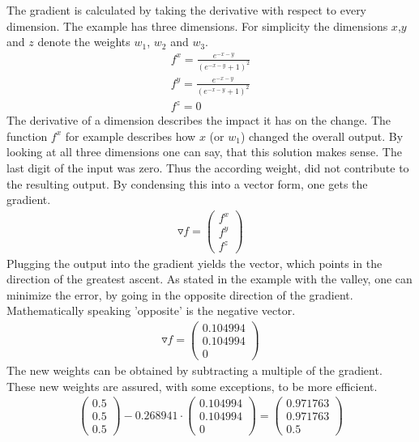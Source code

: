 \documentclass[12pt]{article}
\begin{document}
The gradient is calculated by taking the derivative with respect to every dimension.  The example has three dimensions. For simplicity the dimensions $x$,$y$ and $z$ denote the weights $ w_{1} $, $ w_{2} $ and $ w_{3}$. 
\begin{equation}\nonumber
\begin{gathered}
f^{x} = \frac{e^{-x-y}}{\left ( e^{-x-y}+1 \right )^{2}}\\
f^{y} = \frac{e^{-x-y}}{\left ( e^{-x-y}+1 \right )^{2}}\\
f^{z} = 0
\end{gathered}
\end{equation}
The derivative of a dimension describes the impact it has on the change. The function $f^{x}$ for example describes how $x$ (or $w_{1}$) changed the overall output. By looking at all three dimensions one can say, that this solution makes sense. The last digit of the input was zero. Thus the according weight, did not contribute to the resulting output. By condensing this into a vector form, one gets the gradient.
\begin{equation}\nonumber
\begin{gathered}
\triangledown f = \begin{pmatrix}f^{x}\\ f^{y}\\ f^{z}
\end{pmatrix}
\end{gathered}
\end{equation}
Plugging the output into the gradient yields the vector, which points in the direction of the greatest ascent. As stated in the example with the valley, one can minimize the error, by going in the opposite direction of the gradient. Mathematically speaking 'opposite' is the negative vector. 
\begin{equation}
\begin{gathered}
\triangledown f = \begin{pmatrix}0.104994\\ 0.104994\\ 0
\end{pmatrix}
\end{gathered}
\end{equation}
The new weights can be obtained by subtracting a multiple of the gradient. These new weights are assured, with some exceptions, to be more efficient.
\begin{equation}\nonumber
\begin{gathered}
\begin{pmatrix}0.5\\ 0.5\\ 0.5\end{pmatrix} - 0.268941 \cdot \begin{pmatrix}0.104994\\ 0.104994\\ 0\end{pmatrix} = 
\begin{pmatrix}0.971763\\ 0.971763\\ 0.5\end{pmatrix}
\end{gathered}
\end{equation}
\end{document}
